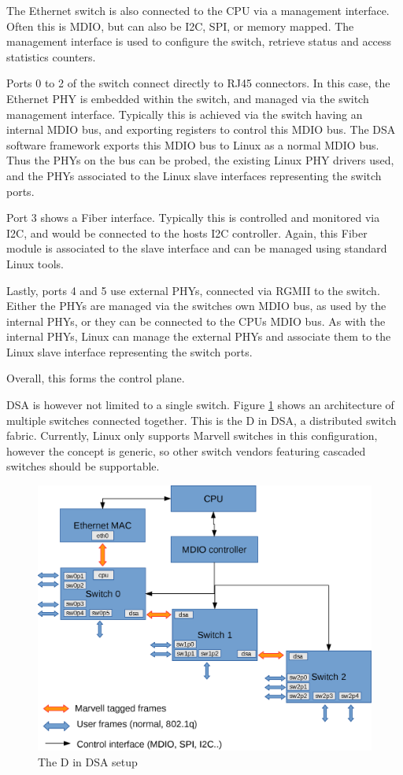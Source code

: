 \documentclass[letterpaper]{article}
\begin{document}
The Ethernet switch is also connected to the CPU via a management
interface. Often this is MDIO, but can also be I2C, SPI, or memory
mapped. The management interface is used to configure the switch,
retrieve status and access statistics counters.

Ports 0 to 2 of the switch connect directly to RJ45 connectors. In
this case, the Ethernet PHY is embedded within the switch, and managed
via the switch management interface. Typically this is achieved via
the switch having an internal MDIO bus, and exporting registers to
control this MDIO bus. The DSA software framework exports this MDIO
bus to Linux as a normal MDIO bus. Thus the PHYs on the bus can be
probed, the existing Linux PHY drivers used, and the PHYs associated
to the Linux slave interfaces representing the switch ports.

Port 3 shows a Fiber interface. Typically this is controlled and
monitored via I2C, and would be connected to the hosts I2C
controller. Again, this Fiber module is associated to the slave
interface and can be managed using standard Linux tools.

Lastly, ports 4 and 5 use external PHYs, connected via RGMII to the
switch. Either the PHYs are managed via the switches own MDIO bus, as
used by the internal PHYs, or they can be connected to the CPUs MDIO
bus. As with the internal PHYs, Linux can manage the external PHYs and
associate them to the Linux slave interface representing the switch
ports.

Overall, this forms the control plane.

DSA is however not limited to a single switch. Figure \ref{d-in-dsa}
shows an architecture of multiple switches connected together. This is
the D in DSA, a distributed switch fabric. Currently, Linux only supports
Marvell switches in this configuration, however the concept is
generic, so other switch vendors featuring cascaded switches should be
supportable.

\begin{figure}[ht]
  \centering
  \includegraphics[width=\columnwidth]{DSA-D-in-DSA.eps}
  \caption{The D in DSA setup}
  \label{d-in-dsa}
\end{figure}
\end{document}
